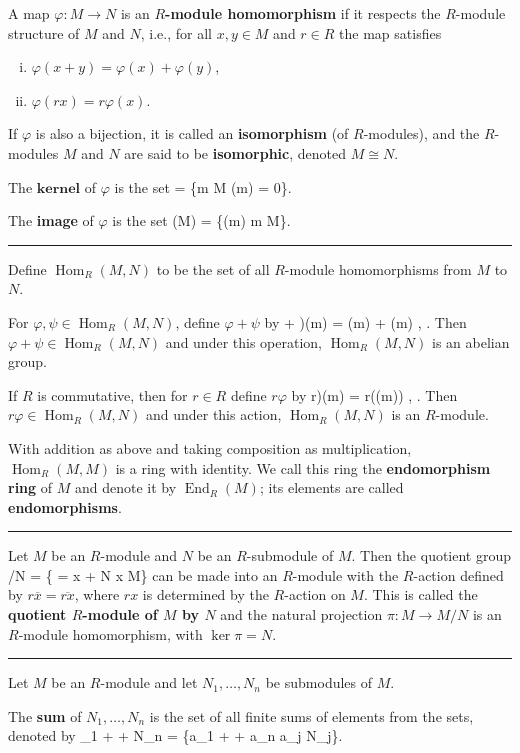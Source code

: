 \documentclass[12pt]{article}
\newcommand{\keyword}[1]{\textbf{#1}}
\def\[#1\]{\begin{align*}#1\end{align*}}
\newcommand{\sepline}{\rule{\textwidth}{0.4pt}}
\theoremstyle{definition}
\newcommand{\tc}[1]{, \qquad \text{#1}}
\newcommand{\cfa}[1]{, \qquad \text{for all $#1$}}
\renewcommand{\phi}{\varphi}
\newcommand{\<}{\left\langle}
\renewcommand{\>}{\right\rangle}
\newcommand{\isom}{\cong}
\newcommand{\eqc}{\overline}
\DeclareMathOperator{\Hom}{Hom}
\DeclareMathOperator{\End}{End}
\begin{document}
A map $\phi : M \to N$ is an \keyword{$R$-module homomorphism} if it respects the $R$-module structure of $M$ and $N$, i.e., for all $x, y \in M$ and $r \in R$ the map satisfies
\begin{enumerate}[(i)]
    \item $\phi(x + y) = \phi(x) + \phi(y)$,
    \item $\phi(rx) = r\phi(x)$.
\end{enumerate}
If $\phi$ is also a bijection, it is called an \keyword{isomorphism} (of $R$-modules), and the $R$-modules $M$ and $N$ are said to be \keyword{isomorphic}, denoted $M \isom N$.

The $\keyword{kernel}$ of $\phi$ is the set
\[
    \ker\phi = \{m \in M \mid \phi(m) = 0\}.
\]

The \keyword{image} of $\phi$ is the set
\[
    \phi(M) = \{\phi(m) \mid m \in M\}.
\]

\sepline

Define $\Hom_R(M, N)$ to be the set of all $R$-module homomorphisms from $M$ to $N$.

For $\phi, \psi \in \Hom_R(M, N)$, define $\phi + \psi$ by
\[
    (\phi + \psi)(m) = \phi(m) + \psi(m) \tc{for all $m \in M$}.
\]
Then $\phi + \psi \in \Hom_R(M, N)$ and under this operation, $\Hom_R(M, N)$ is an abelian group.

If $R$ is commutative, then for $r \in R$ define $r\phi$ by
\[
    (r\phi)(m) = r(\phi(m)) \cfa{m \in M}.
\]
Then $r\phi \in \Hom_R(M, N)$ and under this action, $\Hom_R(M, N)$ is an $R$-module.

With addition as above and taking composition as multiplication, $\Hom_R(M, M)$ is a ring with identity. We call this ring the \keyword{endomorphism ring} of $M$ and denote it by $\End_R(M)$; its elements are called \keyword{endomorphisms}.

\sepline

Let $M$ be an $R$-module and $N$ be an $R$-submodule of $M$. Then the quotient group
\[
    M/N = \{\eqc{x} = x + N \mid x \in M\}
\]
can be made into an $R$-module with the $R$-action defined by $r\eqc{x} = \eqc{rx}$, where $rx$ is determined by the $R$-action on $M$. This is called the \keyword{quotient $R$-module of $M$ by $N$} and the natural projection $\pi : M \to M/N$ is an $R$-module homomorphism, with $\ker\pi = N$.

\sepline

Let $M$ be an $R$-module and let $N_1, \dots, N_n$ be submodules of $M$.

The \keyword{sum} of $N_1, \dots, N_n$ is the set of all finite sums of elements from the sets, denoted by
\[
    N_1 + \cdots + N_n = \{a_1 + \cdots + a_n \mid a_j \in N_j\}.
\]
\end{document}
